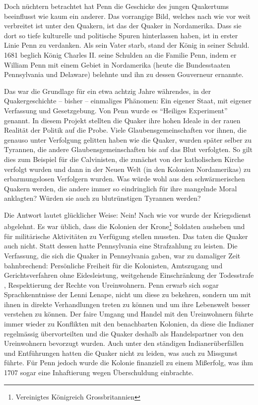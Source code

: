 \medskip

Doch nüchtern betrachtet hat Penn die Geschicke des jungen Quakertums
beeinflusst wie kaum ein anderer. Das vorrangige Bild, welches nach wie vor weit
verbreitet ist unter den Quakern, ist das der Quaker in Nordamerika. Dass sie
dort so tiefe kulturelle und politische Spuren hinterlassen haben, ist in erster
Linie Penn zu verdanken. Als sein Vater starb, stand der König in seiner Schuld.
1681 beglich König Charles II.  seine
Schulden an die Familie Penn, indem er William Penn mit einem
Gebiet in Nordamerika (heute die Bundesstaaten Pennsylvania
 und Delaware) belehnte und ihn
zu dessen Gouverneur ernannte.

\medskip

Das war die Grundlage für ein etwa achtzig Jahre währendes, in der Quakergeschichte
-- bisher -- einmaliges Phänomen: Ein eigener Staat, mit eigener Verfassung und
Gesetzgebung. Von Penn wurde es "`Heiliges Experiment"' genannt. In diesem Projekt
stellten die Quaker ihre hohen Ideale in der rauen Realität der Politik auf die
Probe. Viele Glaubensgemeinschaften vor ihnen, die genauso unter Verfolgung
gelitten haben wie die Quaker, wurden später selber zu Tyrannen, die andere
Glaubensgemeinschaften bis auf das Blut verfolgten. So gilt dies zum Beispiel für die
Calvinisten, die zunächst von der katholischen
Kirche verfolgt wurden und dann in der Neuen Welt (in den Kolonien
Nordamerikas) zu erbarmungslosen Verfolgern wurden. Was würde wohl aus den
schwärmerischen Quakern werden, die andere immer so eindringlich für ihre
mangelnde Moral anklagten? Würden sie auch zu blutrünstigen Tyrannen werden?

\medskip

Die Antwort lautet glücklicher Weise: Nein! Nach wie vor wurde der Kriegsdienst
abgelehnt. Es war üblich, dass die Kolonien der Krone\footnote{Vereinigtes
Königreich Grossbritannien} Soldaten ausheben und für militärische
Aktivitäten zu Verfügung stellen mussten. Das taten die Quaker auch nicht. Statt
dessen hatte Pennsylvania eine Strafzahlung zu leisten. Die Verfassung, die sich
die Quaker in Pennsylvania gaben, war zu damaliger Zeit bahnbrechend: Persönliche
Freiheit für die Kolonisten, Amtszugang und Gerichtsverfahren ohne
Eidesleistung, weitgehende Einschränkung der Todesstrafe
, Respektierung der Rechte von Ureinwohnern. Penn erwarb sich sogar Sprachkenntnisse
 der Lenni Lenape, nicht
um diese zu bekehren, sondern um mit ihnen in direkte Verhandlungen treten zu
können und um ihre Lebenswelt besser verstehen zu können. Der faire Umgang und
Handel mit den Ureinwohnern führte immer wieder zu Konflikten mit den
benachbarten Kolonien, da diese die Indianer regelmässig übervorteilten und
die Quaker deshalb als Handelspartner von den Ureinwohnern bevorzugt wurden.
Auch unter den ständigen Indianerüberfällen und Entführungen
hatten die Quaker nicht zu leiden, was auch zu Missgunst führte. Für Penn jedoch
wurde die Kolonie finanziell zu einem Mißerfolg, was ihm 1707 sogar eine
Inhaftierung wegen Überschuldung einbrachte.

